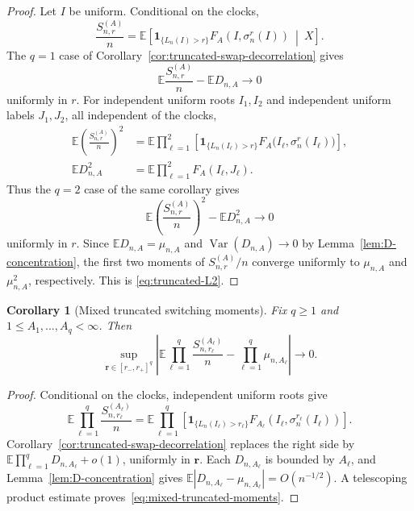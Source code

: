 \documentclass[11pt]{article}
\newcommand{\E}{\mathbb E}
\newcommand{\1}{\mathbf 1}
\newcommand{\Var}{\operatorname{Var}}
\newtheorem{corollary}[theorem]{Corollary}
\theoremstyle{definition}
\theoremstyle{remark}
\begin{document}
\begin{proof}
Let $I$ be uniform.  Conditional on the clocks,
\[
 \frac{S_{n,r}^{(A)}}n
 =\E\left[
   \1_{\{L_n(I)>r\}}F_A(I,\sigma_n^r(I))
   \ \middle|\ X
 \right].
\]
The $q=1$ case of Corollary~\ref{cor:truncated-swap-decorrelation} gives
\[
  \E\frac{S_{n,r}^{(A)}}n-\E D_{n,A}\longrightarrow0
\]
uniformly in $r$.  For independent uniform roots $I_1,I_2$ and
independent uniform labels $J_1,J_2$, all independent of the clocks,
\begin{align*}
 \E\left(\frac{S_{n,r}^{(A)}}n\right)^2
 &=\E\prod_{\ell=1}^2
   \left[
    \1_{\{L_n(I_\ell)>r\}}
    F_A\bigl(I_\ell,\sigma_n^r(I_\ell)\bigr)
   \right],\\
 \E D_{n,A}^2
 &=\E\prod_{\ell=1}^2F_A(I_\ell,J_\ell).
\end{align*}
Thus the $q=2$ case of the same corollary gives
\[
  \E\left(\frac{S_{n,r}^{(A)}}n\right)^2
  -\E D_{n,A}^2\longrightarrow0
\]
uniformly in $r$.  Since $\E D_{n,A}=\mu_{n,A}$ and
$\Var(D_{n,A})\to0$ by Lemma~\ref{lem:D-concentration}, the first two
moments of $S_{n,r}^{(A)}/n$ converge uniformly to
$\mu_{n,A}$ and $\mu_{n,A}^2$, respectively.  This is
\eqref{eq:truncated-L2}.
\end{proof}

\begin{corollary}[Mixed truncated switching moments]
\label{cor:mixed-truncated-moments}
Fix $q\geq1$ and $1\leq A_1,\dots,A_q<\infty$.  Then
\begin{equation}\label{eq:mixed-truncated-moments}
 \sup_{\mathbf r\in[r_-,r_+]^q}
 \left|
  \E\prod_{\ell=1}^q\frac{S_{n,r_\ell}^{(A_\ell)}}n
  -\prod_{\ell=1}^q\mu_{n,A_\ell}
 \right|
 \longrightarrow0.
\end{equation}
\end{corollary}

\begin{proof}
Conditional on the clocks, independent uniform roots give
\[
 \E\prod_{\ell=1}^q\frac{S_{n,r_\ell}^{(A_\ell)}}n
 =\E\prod_{\ell=1}^q
 \left[
  \1_{\{L_n(I_\ell)>r_\ell\}}
  F_{A_\ell}(I_\ell,\sigma_n^{r_\ell}(I_\ell))
 \right].
\]
Corollary~\ref{cor:truncated-swap-decorrelation} replaces the right side
by
$\E\prod_{\ell=1}^qD_{n,A_\ell}+o(1)$, uniformly in $\mathbf r$.
Each $D_{n,A_\ell}$ is bounded by $A_\ell$, and
Lemma~\ref{lem:D-concentration} gives
$\E|D_{n,A_\ell}-\mu_{n,A_\ell}|=O(n^{-1/2})$.  A telescoping product
estimate proves~\eqref{eq:mixed-truncated-moments}.
\end{proof}
\end{document}
